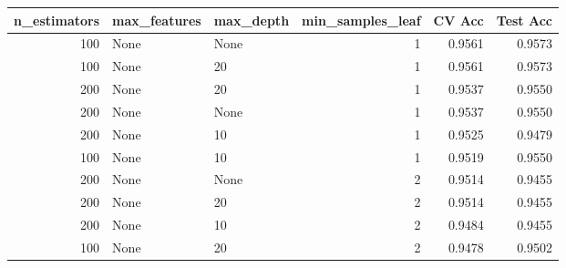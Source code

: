 \begin{tabular}{rllrrr}
\toprule
n\_estimators & max\_features & max\_depth & min\_samples\_leaf & CV Acc & Test Acc \\
\midrule
100 & None & None & 1 & 0.9561 & 0.9573 \\
100 & None & 20 & 1 & 0.9561 & 0.9573 \\
200 & None & 20 & 1 & 0.9537 & 0.9550 \\
200 & None & None & 1 & 0.9537 & 0.9550 \\
200 & None & 10 & 1 & 0.9525 & 0.9479 \\
100 & None & 10 & 1 & 0.9519 & 0.9550 \\
200 & None & None & 2 & 0.9514 & 0.9455 \\
200 & None & 20 & 2 & 0.9514 & 0.9455 \\
200 & None & 10 & 2 & 0.9484 & 0.9455 \\
100 & None & 20 & 2 & 0.9478 & 0.9502 \\
\bottomrule
\end{tabular}
